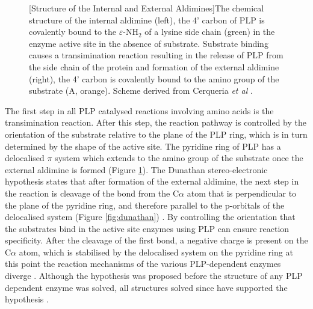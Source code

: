 


\begin{figure}[!htbp]
\begin{minipage}{\linewidth}

	[Structure of the Internal and External Aldimines]{The chemical structure of the internal aldimine (left), the 4' carbon of PLP is covalently bound to the $\varepsilon$-NH$_2$ of a lysine side chain (green) in the enzyme active site in the absence of substrate. Substrate binding causes a transimination reaction resulting in the release of PLP from the side chain of the protein and formation of the external aldimine (right), the 4' carbon is covalently bound to the amino group of the substrate (A, orange). Scheme derived from Cerqueria \textit{et al} \cite{Cerqueria2011}.\label{fig:transimination}}	
\end{minipage}    
\end{figure}

The first step in all PLP catalysed reactions involving amino acids is the transimination reaction. After this step, the reaction pathway is controlled by the orientation of the substrate relative to the plane of the PLP ring, which is in turn determined by the shape of the active site. The pyridine ring of PLP has a delocalised $\pi$ system which extends to the amino group of the substrate once the external aldimine is formed (Figure \ref{fig:transimination}). The Dunathan stereo-electronic hypothesis states that after formation of the external aldimine, the next step in the reaction is cleavage of the bond from the C$\alpha$ atom that is perpendicular to the plane of the pyridine ring, and therefore parallel to the p-orbitals of the delocalised system (Figure \ref{fig:dunathan}) \cite{Dunathan1966}. By controlling the orientation that the substrates bind in the active site enzymes using PLP can ensure reaction specificity. After the cleavage of the first bond, a negative charge is present on the C$\alpha$ atom, which is stabilised by the delocalised system on the pyridine ring at this point the reaction mechanisms of the various PLP-dependent enzymes diverge \cite{Toney2011,Percudani2009}. Although the hypothesis was proposed before the structure of any PLP dependent enzyme was solved, all structures solved since have supported the hypothesis \cite{Toney2011}.      

